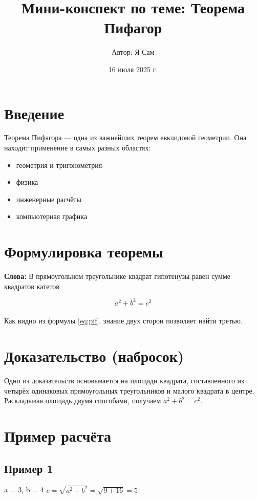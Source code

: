 \documentclass{article}
\title{Мини-конспект по теме: Теорема Пифагор}
\author{Автор: Я Сам }
\date{16 июля 2025 г.}
\begin{document}
\maketitle
\tableofcontents
\newpage
\section{Введение}
Теорема Пифагора — одна из важнейших теорем евклидовой геометрии. Она находит
применение в самых разных областях:
\begin{itemize}
    \item геометрия и тригонометрия
    \item физика
    \item инженерные расчёты
    \item компьютерная графика
\end{itemize}
\section{Формулировка теоремы}
\textbf{Слова:} В прямоугольном треугольнике квадрат гипотенузы равен сумме квадратов
катетов
\begin{center}
\begin{equation}
a^2 + b^2 = c^2 \label{eq:pif}
\end{equation}
\\
Как видно из формулы \ref{eq:pif}, знание двух сторон позволяет найти третью.
\end{center}

\section{Доказательство (набросок)}
\begin{center}
Одно из доказательств основывается на площади квадрата, составленного
из четырёх одинаковых прямоугольных треугольников и малого квадрата
в центре. Раскладывая площадь двумя способами, получаем $a^2 + b^2 = c^2$.
\end{center}

\section{Пример расчёта}
\subsection{Пример 1}
\begin{center}
    a = 3, b = 4
$c=\sqrt{a^2+b^2}=\sqrt{9+16}=5$
\end{center}
\end{document}
